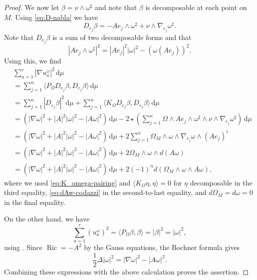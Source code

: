 \documentclass[10pt,a4paper]{amsart}
\DeclareMathOperator{\Ric}{Ric}
\newcommand{\bangle}[1]{\langle #1 \rangle}
\newcommand{\dvol}{\,\mathrm{d}\mu}%
\begin{document}
\begin{proof}
We now let $\beta = \nu \wedge \omega^\sharp$ and note that $\beta$ is decomposable at each point on $M$. Using \eqref{eq:D-nabla} we have 
\[
D_{e_j} \beta = - A e_j \wedge \omega^\sharp + \nu \wedge \nabla_{e_j} \omega^\sharp. 
\]
Note that $D_{e_j}\beta$ is a sum of two decomposable forms and that
\[
|Ae_j \wedge \omega^\sharp|^2 = |Ae_j|^2 |\omega|^2 - (\omega(Ae_j))^2.
\]
Using this, we find 
\begin{align*}
& \sum_{a=1}^r |\nabla u_a^\omega|^2 \dvol \\
& = \sum_{j=1}^n \bangle{P_\Omega D_{e_j} \beta,D_{e_j} \beta }\dvol  \\
& = \sum_{j=1}^n   |D_{e_j}\beta|^2 \dvol +  \sum_{j=1}^n\bangle{K_\Omega D_{e_j} \beta,D_{e_j} \beta}\dvol \\
& = (|\nabla \omega|^2  + |A|^2 |\omega|^2 -  |A\omega|^2) \dvol - 2 \star \left( \sum_{j=1}^n \Omega \wedge Ae_j \wedge \omega^\sharp \wedge \nu \wedge \nabla_{e_j}\omega^\sharp \right) \dvol\\
& = (|\nabla \omega|^2  + |A|^2 |\omega|^2 -  |A\omega|^2) \dvol + 2   \sum_{j=1}^n \Omega_M  \wedge \omega  \wedge  \nabla_{e_j}\omega\wedge (Ae_j)^\flat \\
& = (|\nabla \omega|^2  + |A|^2 |\omega|^2 -  |A\omega|^2) \dvol + 2    \Omega_M  \wedge \omega \wedge d(A \omega) \\
& = (|\nabla \omega|^2  + |A|^2 |\omega|^2 -  |A\omega|^2) \dvol + 2(-1)^n d(\Omega_M  \wedge \omega \wedge A \omega) ,
\end{align*}
where we used \eqref{eq:K_omega-pairing} and $\bangle{K_\Omega \eta,\eta} = 0$ for $\eta$ decomposable in the third equality, \eqref{eq:dAw-codazzi} in the second-to-last equality, and $d\Omega_M = d\omega = 0$ in the final equality. 


On the other hand, we have
\[
\sum_{a=1}^r (u_a^\omega)^2 = \bangle{P_\Omega \beta,\beta} = |\beta|^2 = |\omega|^2,
\]
using . Since $\Ric = - A^2$ by the Gauss equations, the Bochner formula gives 
\[
\frac 12 \Delta |\omega|^2 = |\nabla \omega|^2 - |A\omega|^2 . 
\]
Combining these expressions with the above calculation proves the assertion. 
\end{proof}
\end{document}
